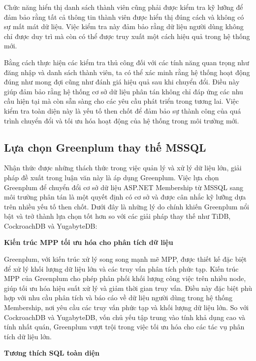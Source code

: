 \documentclass{article}[14pt]
\begin{document}
Chức năng hiển thị danh sách thành viên cũng phải được kiểm tra kỹ lưỡng để đảm bảo rằng tất cả thông tin thành viên được hiển thị đúng cách và không có sự mất mát dữ liệu. Việc kiểm tra này đảm bảo rằng dữ liệu người dùng không chỉ được duy trì mà còn có thể được truy xuất một cách hiệu quả trong hệ thống mới.

Bằng cách thực hiện các kiểm tra thủ công đối với các tính năng quan trọng như đăng nhập và danh sách thành viên, ta có thể xác minh rằng hệ thống hoạt động đúng như mong đợi cũng như đánh giá hiệu quả sau khi chuyển đổi. Điều này giúp đảm bảo rằng hệ thống cơ sở dữ liệu phân tán không chỉ đáp ứng các nhu cầu hiện tại mà còn sẵn sàng cho các yêu cầu phát triển trong tương lai. Việc kiểm tra toàn diện này là yếu tố then chốt để đảm bảo sự thành công của quá trình chuyển đổi và tối ưu hóa hoạt động của hệ thống trong môi trường mới.

\subsection{Lựa chọn Greenplum thay thế MSSQL}

Nhận thức được những thách thức trong việc quản lý và xử lý dữ liệu lớn, giải pháp đề xuất trong luận văn này là áp dụng Greenplum. Việc lựa chọn Greenplum để chuyển đổi cơ sở dữ liệu ASP.NET Membership từ MSSQL sang môi trường phân tán là một quyết định có cơ sở và được cân nhắc kỹ lưỡng dựa trên nhiều yếu tố then chốt. Dưới đây là những lý do chính khiến Greenplum nổi bật và trở thành lựa chọn tốt hơn so với các giải pháp thay thế như TiDB, CockroachDB và YugabyteDB:

\textbf{Kiến trúc MPP tối ưu hóa cho phân tích dữ liệu}

Greenplum, với kiến trúc xử lý song song mạnh mẽ MPP, được thiết kế đặc biệt để xử lý khối lượng dữ liệu lớn và các truy vấn phân tích phức tạp. Kiến trúc MPP của Greenplum cho phép phân phối khối lượng công việc trên nhiều node, giúp tối ưu hóa hiệu suất xử lý và giảm thời gian truy vấn. Điều này đặc biệt phù hợp với nhu cầu phân tích và báo cáo về dữ liệu người dùng trong hệ thống Membership, nơi yêu cầu các truy vấn phức tạp và khối lượng dữ liệu lớn. So với CockroachDB và YugabyteDB, vốn chủ yếu tập trung vào tính khả dụng cao và tính nhất quán, Greenplum vượt trội trong việc tối ưu hóa cho các tác vụ phân tích dữ liệu lớn.

\textbf{Tương thích SQL toàn diện}
\end{document}
